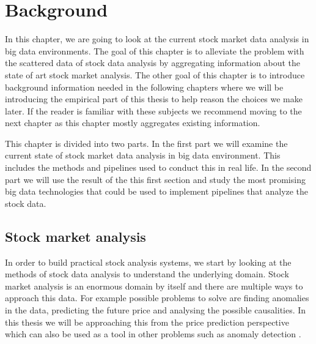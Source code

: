 \chapter{Background}
\label{chapter:background} 

In this chapter, we are going to look at the current stock market data analysis in big data environments.
The goal of this chapter is to alleviate the problem with the scattered data of stock data analysis by aggregating information about the state of art stock market analysis.
The other goal of this chapter is to introduce background information needed in the following chapters where we will be introducing the empirical part of this thesis to help reason the choices we make later.
If the reader is familiar with these subjects we recommend moving to the next chapter as this chapter mostly aggregates existing information.

This chapter is divided into two parts.
In the first part we will examine the current state of stock market data analysis in big data environment.
This includes the methods and pipelines used to conduct this in real life.
In the second part we will use the result of the this first section and study the most promising big data technologies that could be used to implement pipelines that analyze the stock data.



\section{Stock market analysis}

In order to build practical stock analysis systems, we start by looking at the methods of stock data analysis to understand the underlying domain.
Stock market analysis is an enormous domain by itself and there are multiple ways to approach this data.
For example possible problems to solve are finding anomalies in the data, predicting the future price and analysing the possible causalities.
In this thesis we will be approaching this from the price prediction perspective which can also be used as a tool in other problems such as anomaly detection \cite{islam}.

